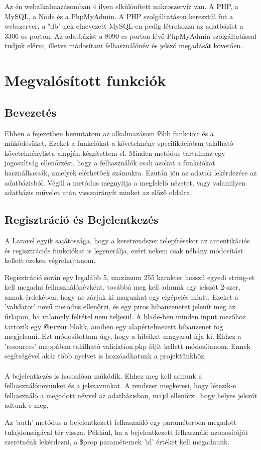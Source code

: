 \documentclass[
]{thesis-ekf}
\theoremstyle{definition}
\theoremstyle{remark}
\begin{document}
Az én webalkalmazásomban 4 ilyen elkülönített mikroszervíz van. A PHP, a MySQL, a Node és a PhpMyAdmin. A PHP szolgáltatáson keresztül fut a webszerver, a "db"-nek elnevezett MySQL-en pedig létrehozza az adatbázist a 3306-os porton. Az adatbázist a 8090-es porton lévő PhpMyAdmin szolgáltatással tudjuk elérni, illetve módosítani felhasználónév és jelszó megadását követően.

\chapter{Megvalósított funkciók}
\section{Bevezetés}
Ebben a fejezetben bemutatom az alkalmazásom főbb funkcióit és a működésüket. Ezeket a funkciókat a követelmény specifikációban található követelménylista alapján készítettem el. Minden metódus tartalmaz egy jogosultság ellenőrzést, hogy a felhasználók csak azokat a funkciókat használhassák, amelyek elérhetőek számukra. Ezután jön az adatok lekérdezése az adatbázisból. Végül a metódus megnyitja a megfelelő nézetet, vagy valamilyen adatbázis művelet után visszairányít minket az előző oldalra.

\section{Regisztráció és Bejelentkezés}

A Laravel egyik sajátossága, hogy a keretrendszer telepítésekor az autentikációs és regisztrációs funkciókat is legenerálja, ezért nekem csak néhány módosítást kellett ezeken végrehajtanom.


\vspace{5mm}
\noindent
Regisztráció során egy legalább 5, maximum 255 karakter hosszú egyedi string-et kell megadni felhasználónévként, továbbá meg kell adnunk egy jelszót 2-szer, annak érdekében, hogy ne zárjuk ki magunkat egy elgépelés miatt. Ezeket a 'validator' nevű metódus ellenőrzi, és egy piros hibaüzenetet jelenít meg az űrlapon, ha valamely feltétel nem teljesül. A blade-ben minden input mezőhöz tartozik egy \textbf{@error} blokk, amiben egy alapértelmezett hibaüzenet fog megjelenni. Ezt módosítottam úgy, hogy a hibákat magyarul írja ki. Ehhez a 'resources' mappában található validation.php fájlt kellett módosítanom. Ennek segítségével akár több nyelvet is hozzáadhatunk a projektünkhöz.
\\\\
A bejelentkezés is hasonlóan működik. Ehhez meg kell adnunk a felhasználónevünket és a jelszavunkat. A rendszer megkeresi, hogy létezik-e felhasználó a megadott névvel az adatbázisban, majd ellenőrzi, hogy helyes jelszót adtunk-e meg. 

\vspace{5mm}
\noindent
Az 'auth' metódus a bejelentkezett felhasználó egy paraméterben megadott tulajdonságával tér vissza. Például, ha a bejelentkezett felhasználó azonosítóját szeretnénk lekérdezni, a \$prop paraméternek 'id' értéket kell megadnunk.
\end{document}
